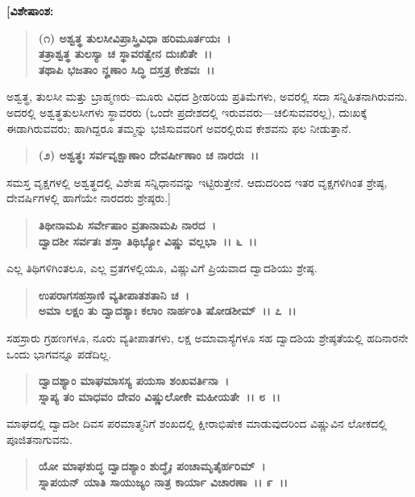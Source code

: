 \begin{flushleft}
\textbf{[ವಿಶೇಷಾಂಶ:}
\end{flushleft}

\begin{verse}
\textbf{(೧) ಅಶ್ವತ್ಥ ತುಲಸೀವಿಪ್ರಾಸ್ತ್ರಿವಿಧಾ ಹರಿಮೂರ್ತಯಃ~।}\\\textbf{ತತ್ರಾಶ್ವತ್ಥ ತುಲಸ್ಯಾ ಚ ಸ್ಥಾವರತ್ವೇನ ದುಃಖಿತೇ~।।}\\\textbf{ತಥಾಪಿ ಭಜತಾಂ ನೄಣಾಂ ಸಿದ್ಧಿ ದಸ್ತತ್ರ ಕೇಶವಃ~।।} 
\end{verse}

ಅಶ್ವತ್ಥ, ತುಲಸೀ ಮತ್ತು ಬ್ರಾಹ್ಮಣರು–ಮೂರು ವಿಧದ ಶ‍್ರೀಹರಿಯ ಪ್ರತಿಮೆಗಳು, ಅವರಲ್ಲಿ ಸದಾ ಸನ್ನಿಹಿತನಾಗಿರುವನು. ಅದರಲ್ಲಿ ಅಶ್ವತ್ಥತುಲಸೀಗಳು ಸ್ಥಾವರರು (ಒಂದೇ ಪ್ರದೇಶದಲ್ಲಿ ಇರುವವರು––ಚಲಿಸುವವರಲ್ಲ), ದುಃಖಕ್ಕೆ ಈಡಾಗಿರುವವರು; ಹಾಗಿದ್ದರೂ ತಮ್ಮನ್ನು ಭಜಿಸುವವರಿಗೆ ಅವರಲ್ಲಿರುವ ಕೇಶವನು ಫಲ ನೀಡುತ್ತಾನೆ.

\begin{verse}
\textbf{(೨) ಅಶ್ವತ್ಥಃ ಸರ್ವವೃಕ್ಷಾಣಾಂ ದೇವರ್ಷೀಣಾಂ ಚ ನಾರದಃ~।।} 
\end{verse}

ಸಮಸ್ತ ವೃಕ್ಷಗಳಲ್ಲಿ ಅಶ್ವತ್ಥದಲ್ಲಿ ವಿಶೇಷ ಸನ್ನಿಧಾನವನ್ನು ಇಟ್ಟಿರುತ್ತೇನೆ. ಆದುದರಿಂದ ಇತರ ವೃಕ್ಷಗಳಿಗಿಂತ ಶ್ರೇಷ್ಠ, ದೇವರ್ಷಿಗಳಲ್ಲಿ ಹಾಗೆಯೇ ನಾರದರು ಶ್ರೇಷ್ಠರು.]

\begin{verse}
\textbf{ತಿಥೀನಾಮಪಿ ಸರ್ವೇಷಾಂ ವ್ರತಾನಾಮಪಿ ನಾರದ~।}\\\textbf{ದ್ವಾದಶೀ ಸರ್ವತಃ ಶಸ್ತಾ ತಿಥಿಭ್ಯೋ ವಿಷ್ಣು ವಲ್ಲಭಾ~।। ೬~।।}
\end{verse}

ಎಲ್ಲ ತಿಥಿಗಳಿಗಿಂತಲೂ, ಎಲ್ಲ ವ್ರತಗಳಲ್ಲಿಯೂ, ವಿಷ್ಣುವಿಗೆ ಪ್ರಿಯವಾದ ದ್ವಾದಶಿಯು ಶ್ರೇಷ್ಠ.

\begin{verse}
\textbf{ಉಪರಾಗಸಹಸ್ರಾಣಿ ವ್ಯತೀಪಾತಶತಾನಿ ಚ~।}\\\textbf{ಅಮಾ ಲಕ್ಷಂ ತು ದ್ವಾದಶ್ಯಾಃ ಕಲಾಂ ನಾರ್ಹಂತಿ ಷೋಡಶೀಮ್~।। ೭~।।}
\end{verse}

ಸಹಸ್ರಾರು ಗ್ರಹಣಗಳೂ, ನೂರು ವ್ಯತೀಪಾತಗಳು, ಲಕ್ಷ ಅಮಾವಾಸ್ಯೆಗಳೂ ಸಹ ದ್ವಾದಶಿಯ ಶ್ರೇಷ್ಠತೆಯಲ್ಲಿ ಹದಿನಾರನೇ ಒಂದು ಭಾಗವನ್ನೂ ಪಡೆದಿಲ್ಲ.

\begin{verse}
\textbf{ದ್ವಾದಶ್ಯಾಂ ಮಾಘಮಾಸಸ್ಯ ಪಯಸಾ ಶಂಖವರ್ತಿನಾ~।}\\\textbf{ಸ್ನಾಪ್ಯ ತಂ ಮಾಧವಂ ದೇವಂ ವಿಷ್ಣುಲೋಕೇ ಮಹೀಯತೇ~।। ೮~।।}
\end{verse}

ಮಾಘದಲ್ಲಿ ದ್ವಾದಶೀ ದಿವಸ ಪರಮಾತ್ಮನಿಗೆ ಶಂಖದಲ್ಲಿ ಕ್ಷೀರಾಭಿಷೇಕ ಮಾಡುವುದರಿಂದ ವಿಷ್ಣುವಿನ ಲೋಕದಲ್ಲಿ ಪೂಜಿತನಾಗುವನು.

\begin{verse}
\textbf{ಯೋ ಮಾಘಶುದ್ಧ ದ್ವಾದಶ್ಯಾಂ ಶುದ್ಧೈಃ ಪಂಚಾಮೃತೈರ್ಹರಿಮ್~।}\\\textbf{ಸ್ನಾಪಯನ್ ಯಾತಿ ಸಾಯುಜ್ಯಂ ನಾತ್ರ ಕಾರ್ಯಾ ವಿಚಾರಣಾ~।। ೯~।।}
\end{verse}

